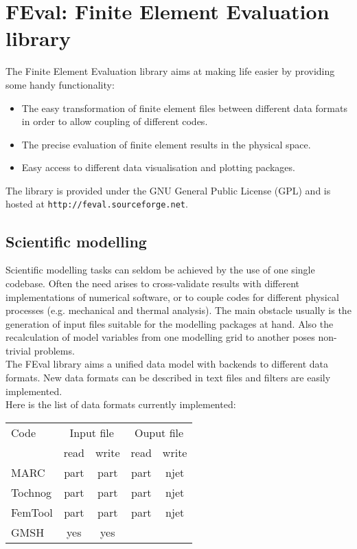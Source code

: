 
\section{FEval: Finite Element Evaluation library}
\label{sec:feval:-finite-elem}

The Finite Element Evaluation library aims at making life easier by providing
some handy functionality:

\begin{itemize}
\item The easy transformation of finite element files between different data
  formats in order to allow coupling of different codes.
\item The precise evaluation of finite element results in the physical space.
\item Easy access to different data visualisation and plotting packages.
\end{itemize}

The library is provided under the GNU General Public License (GPL) and is
hosted at \texttt{http://feval.sourceforge.net}.

\subsection{Scientific modelling}
\label{sec:scientific-modelling}

Scientific modelling tasks can seldom be achieved by the use of one single
codebase.  Often the need arises to cross-validate results with different
implementations of numerical software, or to couple codes for different
physical processes (e.g. mechanical and thermal analysis).  The main obstacle
usually is the generation of input files suitable for the modelling packages
at hand.  Also the recalculation of model variables from one modelling grid to
another poses non-trivial problems.\\

The FEval library aims a unified data model with backends to different data
formats.  New data formats can be described in text files and filters are
easily implemented.\\

Here is the list of  data formats currently implemented:\\

\begin{tabular}{lcccc}
\hline
Code    & \multicolumn{2}{c}{Input file} & \multicolumn{2}{c}{Ouput file} \\
        & read & write                   &  read & write \\
\hline
MARC    & part & part                    &  part & njet  \\
Tochnog & part & part                    &  part & njet  \\
FemTool & part & part                    &  part & njet  \\
GMSH    & yes  & yes                     &       &       \\
\hline
\end{tabular}



